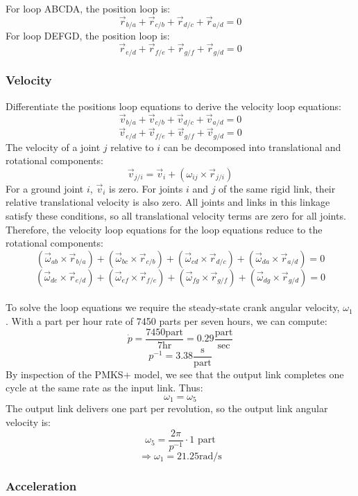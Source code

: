 \documentclass[12pt]{article}
\begin{document}
For loop ABCDA, the position loop is:
\[ \vec{r}_{b/a} + \vec{r}_{c/b} + \vec{r}_{d/c} + \vec{r}_{a/d} = 0 \]
For loop DEFGD, the position loop is:
\[ \vec{r}_{e/d} + \vec{r}_{f/e} + \vec{r}_{g/f} + \vec{r}_{g/d} = 0 \]

\subsubsection{Velocity}%
\label{eqns.kinematics.velocity}

Differentiate the positions loop equations to derive the velocity loop equations:
\[ \vec{v}_{b/a} + \vec{v}_{c/b} + \vec{v}_{d/c} + \vec{v}_{a/d} = 0 \]
\[ \vec{v}_{e/d} + \vec{v}_{f/e} + \vec{v}_{g/f} + \vec{v}_{g/d} = 0 \]
The velocity of a joint $j$ relative to $i$ can be decomposed into translational and rotational components:
\[ \vec{v}_{j/i} = \vec{v}_{i} + (\omega_{ij}\times \vec{r}_{j/i}) \]
For a ground joint $i$, $\vec{v}_{i}$ is zero. For joints $i$ and $j$ of the same rigid link, their relative translational velocity is also zero. All joints and links in this linkage satisfy these conditions, so all translational velocity terms are zero for all joints. Therefore, the velocity loop equations for the loop equations reduce to the rotational components:
\[ (\vec{\omega}_{ab}\times \vec{r}_{b/a}) + (\vec{\omega}_{bc}\times \vec{r}_{c/b}) + (\vec{\omega}_{cd}\times \vec{r}_{d/c}) + (\vec{\omega}_{da}\times \vec{r}_{a/d}) = 0 \]
\[ (\vec{\omega}_{de}\times \vec{r}_{e/d}) + (\vec{\omega}_{ef}\times \vec{r}_{f/e}) + (\vec{\omega}_{fg}\times \vec{r}_{g/f}) + (\vec{\omega}_{dg}\times \vec{r}_{g/d}) = 0 \]\\

To solve the loop equations we require the steady-state crank angular velocity, $\omega_{1}$. With a part per hour rate of 7450 parts per seven hours, we can compute:
\[ \dot{p} = \frac{7450 \text{part}}{7 \text{hr}} = 0.29 \frac{\text{part}}{\text{sec}} \]
\[ p^{-1} = 3.38 \frac{\text{s}}{\text{part}} \]
By inspection of the PMKS+ model, we see that the output link completes one cycle at the same rate as the input link. Thus:
\[ \omega_{1} = \omega_{5} \]
The output link delivers one part per revolution, so the output link angular velocity is:
\[ \omega_{5} = \frac{2\pi}{p^{-1}}\cdot \text{1 part}  \]
\[ \Rightarrow \omega_{1} = 21.25 \text{rad}/\text{s} \]

\subsubsection{Acceleration}%
\label{eqns.kinematics.acceleration}
\end{document}
